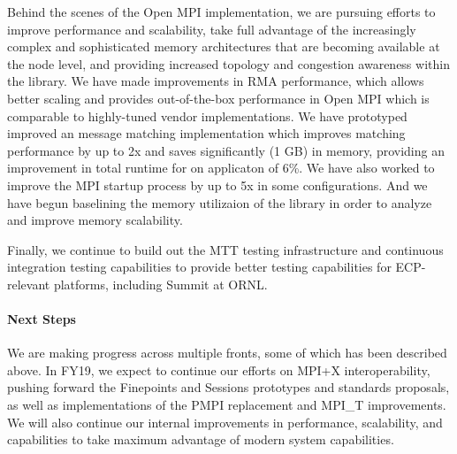 Behind the scenes of the Open MPI implementation, we are pursuing
efforts to improve performance and scalability, take full advantage of
the increasingly complex and sophisticated memory architectures that
are becoming available at the node level, and providing increased
topology and congestion awareness within the library.  We have made
improvements in RMA performance, which allows better scaling and
provides out-of-the-box performance in Open MPI which is comparable to
highly-tuned vendor implementations.  We have prototyped improved an
message matching implementation which improves matching performance by
up to 2x and saves significantly (1 GB) in memory, providing an
improvement in total runtime for on applicaton of 6\%.  We have also
worked to improve the MPI startup process by up to 5x in some
configurations.  And we have begun baselining the memory utilizaion of
the library in order to analyze and improve memory scalability.


%
Finally, we continue to build out the MTT testing infrastructure and
continuous integration testing capabilities to provide better testing
capabilities for ECP-relevant platforms, including Summit at ORNL.

\paragraph{Next Steps}
We are making progress across multiple fronts, some of which has been
described above.  In FY19, we expect to continue our efforts on MPI+X
interoperability, pushing forward the Finepoints and Sessions
prototypes and standards proposals, as well as implementations of the
PMPI replacement and MPI\_T improvements.  We will also continue our
internal improvements in performance, scalability, and capabilities to
take maximum advantage of modern system capabilities.
